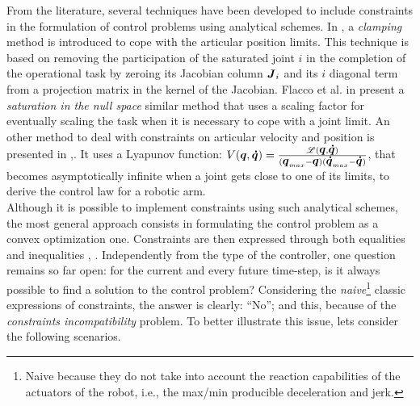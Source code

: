From the literature, several techniques have been developed to include constraints in the formulation of control problems using analytical schemes. In \cite{baerlocher2004inverse}, a \textit{clamping} method is introduced to cope with the articular position limits. This technique is based on removing the participation of the saturated joint $i$ in the completion of the operational task by zeroing its Jacobian column $\mbox{\boldmath${J}$}_i$ and its $i$ diagonal term from a projection matrix in the kernel of the Jacobian. Flacco et al. in \cite{flacco2015control} present a \textit{saturation in the null space} similar method that uses a scaling factor for eventually scaling the task when it is necessary to cope with a joint limit. An other method to deal with constraints on articular velocity and position is presented in \cite{ngo2005passivity},\cite{ngo2006bounded}. It uses a Lyapunov function: $V(\mbox{\boldmath${q}$}, \mbox{\boldmath${\dot{q}}$}) = \frac{\mathscr{L}(\mbox{\boldmath${q}$}, \mbox{\boldmath${\dot{q}}$})}{(\mbox{\boldmath${q}$}_{max}-\mbox{\boldmath${q}$})(\mbox{\boldmath${\dot{q}}$}_{max} - \mbox{\boldmath${\dot{q}}$})}$, that becomes asymptotically infinite when a joint gets close to one of its limits, to derive the control law for a robotic arm. \\
Although it is possible to implement constraints using such analytical schemes, the most general approach consists in formulating the control problem as a convex optimization one. Constraints are then expressed through both equalities and inequalities \allowbreak\cite{chen1994torque}, \allowbreak\cite{ma2002time}. Independently from the type of the controller, one question remains so far open: for the current and every future time-step, is it always possible to find a solution to the control problem? Considering the \textit{naive}\footnote{Naive because they do not take into account the reaction capabilities of the actuators of the robot, i.e., the max/min producible deceleration and jerk.} classic expressions of constraints, the answer is clearly: ``No''; and this, because of the \textit{constraints incompatibility} problem. To better illustrate this issue, lets consider the following scenarios. 

